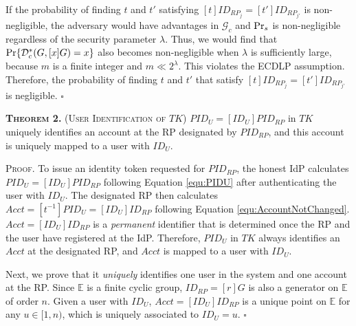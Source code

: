 
If the probability of finding $t$ and $t'$ satisfying $[t]ID_{RP_j} = [t']ID_{RP_{j'}}$ is non-negligible,
    the adversary would have advantages  in $\mathcal{G}_c$ and ${\rm Pr}_s$ is non-negligible regardless of the security parameter $\lambda$.
Thus, we would find that ${\rm Pr}\{\mathcal{D}^*_c(G, [x]G)=x\}$ also becomes non-negligible  when $\lambda$ is sufficiently large, because $m$ is a finite integer and $m \ll 2^\lambda$.
\oldc
This violates the ECDLP assumption. Therefore, the probability of finding $t$ and $t'$ that satisfy $[t]ID_{RP_j} = [t']ID_{RP_{j'}}$ is negligible. \hfill $\square$


\newc
\vspace{2mm}
\noindent\textsc{\textbf{Theorem 2.} (User Identification of $TK$)} { $PID_U= [ID_U]PID_{RP}$ in $TK$ uniquely identifies an account at the RP designated by $PID_{RP}$, and this account is uniquely mapped to a user with $ID_U$.}


\vspace{0.85mm}
\noindent\textsc{Proof.}
To issue an identity token requested for $PID_{RP}$, the honest IdP calculates $PID_U = [ID_U]PID_{RP}$ following Equation \ref{equ:PIDU} after authenticating the user with $ID_U$. The designated RP then calculates $Acct = [t^{-1}]PID_{U} = [ID_U]ID_{RP}$ following Equation \ref{equ:AccountNotChanged}.
$Acct = [ID_U]ID_{RP}$ is a \emph{permanent} identifier that is determined once the RP and the user have registered at the IdP. Therefore, $PID_U$ in $TK$ always identifies an $Acct$ at the designated RP, and $Acct$ is mapped to a user with $ID_U$.

Next, we prove that it \emph{uniquely} identifies one user in the system and one account at the RP. Since $\mathbb{E}$ is a finite cyclic group, $ID_{RP} = [r]G$ is also a generator on $\mathbb{E}$ of order $n$. Given a user with $ID_U$, $Acct = [ID_U]ID_{RP}$ is a unique point on $\mathbb{E}$ for any $u \in [1, n)$, which is uniquely associated to $ID_U=u$. \hfill $\square$

